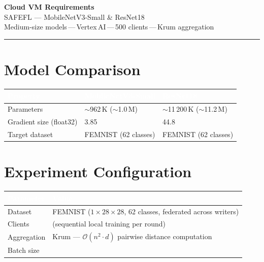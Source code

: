 \documentclass[11pt,a4paper]{article}
\newcommand{\mb}[1]{\SI{#1}{\mega\byte}}
\newcommand{\sectionrule}{\noindent\textcolor{hdrblue}{\rule{\linewidth}{0.6pt}}\vspace{4pt}}
\begin{document}
\begin{center}
  {\LARGE\bfseries\textcolor{hdrblue}{Cloud VM Requirements}}\\[4pt]
  {\large SAFEFL --- MobileNetV3-Small \& ResNet18}\\[2pt]
  {\small Medium-size models\,---\,Vertex\,AI\,---\,500 clients\,---\,Krum aggregation}
\end{center}
\sectionrule

\section*{Model Comparison}

\noindent
\begin{center}
\renewcommand{\arraystretch}{1.3}
\begin{tabular}{
  >{\raggedright\arraybackslash}p{4cm}
  >{\centering\arraybackslash}p{4.5cm}
  >{\centering\arraybackslash}p{4.5cm}}
\toprule
\rowcolor{hdrblue}
\textcolor{white}{\textbf{Property}} &
\textcolor{white}{\textbf{MobileNetV3-Small}} &
\textcolor{white}{\textbf{ResNet18}} \\
\midrule
Parameters             & $\sim$962\,K ($\sim$1.0\,M)  & $\sim$11\,200\,K ($\sim$11.2\,M) \\
\rowcolor{rowgray}
Gradient size (float32)& \mb{3.85}                    & \mb{44.8} \\
Target dataset         & FEMNIST (62 classes)          & FEMNIST (62 classes) \\
\bottomrule
\end{tabular}
\end{center}

\section*{Experiment Configuration}

\noindent
\begin{center}
\renewcommand{\arraystretch}{1.3}
\begin{tabular}{
  >{\raggedright\arraybackslash}p{3.8cm}
  >{\raggedright\arraybackslash}p{9.5cm}}
\toprule
\rowcolor{hdrblue}
\textcolor{white}{\textbf{Parameter}} &
\textcolor{white}{\textbf{Value}} \\
\midrule
Dataset        & FEMNIST ($1\!\times\!28\!\times\!28$, 62 classes, federated across writers) \\
\rowcolor{rowgray}
Clients        & 500 (sequential local training per round) \\
Aggregation    & Krum --- $\mathcal{O}(n^{2}\!\cdot\!d)$ pairwise distance computation \\
\rowcolor{rowgray}
Batch size     & 32 \\
\bottomrule
\end{tabular}
\end{center}
\end{document}

